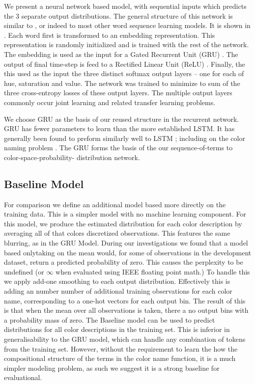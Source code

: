 \documentclass[11pt,letterpaper]{article}
\newcommand{\parencite}{\cite}
\newcommand{\textcite}{\newcite}
\begin{document}
We present a neural network based model, with sequential inputs which predicts the 3 separate output distributions. The general structure of this network is similar to \textcite{2016arXiv160603821M}, or indeed to most other word sequence learning models.
It is shown in .
Each word first is transformed to an embedding representation.
This representation is randomly initialized and is trained with the rest of the network.
The embedding is used as the input for a Gated Recurrent Unit (GRU)  \parencite{cho2014properties,chung2014empirical}.
The output of final time-step is feed to a Rectified Linear Unit (ReLU)  \parencite{dahl2013reludropout}.
Finally, the this used as the input the three distinct softmax output layers -- one for each of hue, saturation and value.
The network was trained to minimize to sum of the three cross-entropy losses of these output layers.
The multiple output layers commonly occur joint learning and related transfer learning problems.

We choose GRU as the basis of our reused structure in the recurrent network.
GRU has fewer parameters to learn than the more established LSTM.
It has generally been found to preform similarly well to LSTM \parencite{chung2014empirical};
including on the color naming problem \parencite{2016arXiv160603821M}.
The GRU forms the basis of the our sequence-of-terms to color-space-probability- distribution network.



\subsection{Baseline Model}
For comparison we define an additional model based more directly on the training data.
This is a simpler model with no machine learning component.
For this model, we produce the estimated distribution for each color description by averaging all of that colors discretized observations.
This features the same blurring, as in the GRU Model.
During our investigations we found that a model based onlytaking on the mean would, for some of observations in the development dataset, return a predicted probability of zero.
This causes the perplexity to be undefined (or $\infty$ when evaluated using IEEE floating point math.)
To handle this we apply add-one smoothing to each output distribution.
Effectively this is adding an number number of additional training observations for each color name,
corresponding to a one-hot vectors for each output bin.
The result of this is that when the mean over all observations is taken, there a no output bins with a probability mass of zero.
The Baseline model can be used to predict distributions for all color descriptions in the training set.
This is inferior in generalisability to the GRU model, which can handle any combination of tokens from the training set.
However, without the requirement to learn the how the compositional structure of the terms in the color name function, it is a much simpler modeling problem, as such we suggest it is a strong baseline for evaluational.
\end{document}
